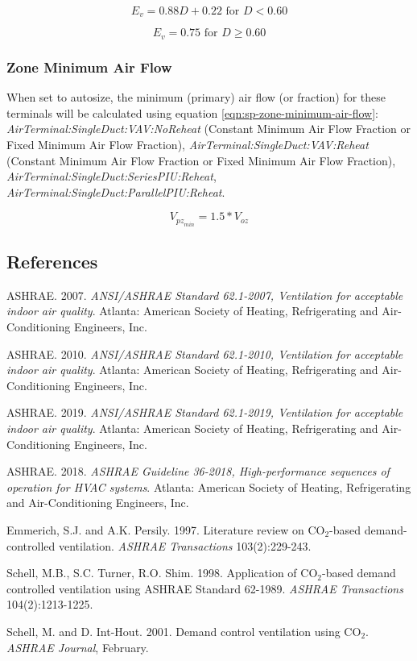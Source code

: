 \begin{equation}\label{eqn:ev-high-d}
{E_{v}} = 0.88 {D} + 0.22 \text{ for } D < 0.60
\end{equation}

\begin{equation}\label{eqn:ev-low-d}
{E_{v}} = 0.75 \text{ for } D \geq 0.60
\end{equation}

\subsubsection{Zone Minimum Air Flow}\label{sp-zone-minimum-air-flow}
When set to autosize, the minimum (primary) air flow (or fraction) for these terminals will be calculated using equation \ref{eqn:sp-zone-minimum-air-flow}: \emph{AirTerminal:SingleDuct:VAV:NoReheat} (Constant Minimum Air Flow Fraction or Fixed Minimum Air Flow Fraction), \emph{AirTerminal:SingleDuct:VAV:Reheat} (Constant Minimum Air Flow Fraction or Fixed Minimum Air Flow Fraction), \emph{AirTerminal:SingleDuct:SeriesPIU:Reheat}, \emph{AirTerminal:SingleDuct:ParallelPIU:Reheat}.

\begin{equation}\label{eqn:sp-zone-minimum-air-flow}
{V_{{pz}_{min}}} = 1.5 * {V_{oz}}
\end{equation}

\subsection{References}\label{references-018}

ASHRAE. 2007. \emph{ANSI/ASHRAE Standard 62.1-2007, Ventilation for acceptable indoor air quality}. Atlanta: American Society of Heating, Refrigerating and Air-Conditioning Engineers, Inc.

ASHRAE. 2010. \emph{ANSI/ASHRAE Standard 62.1-2010, Ventilation for acceptable indoor air quality}. Atlanta: American Society of Heating, Refrigerating and Air-Conditioning Engineers, Inc.

ASHRAE. 2019. \emph{ANSI/ASHRAE Standard 62.1-2019, Ventilation for acceptable indoor air quality}. Atlanta: American Society of Heating, Refrigerating and Air-Conditioning Engineers, Inc.

ASHRAE. 2018. \emph{ASHRAE Guideline 36-2018, High-performance sequences of operation for HVAC systems}. Atlanta: American Society of Heating, Refrigerating and Air-Conditioning Engineers, Inc.

Emmerich, S.J. and A.K. Persily. 1997. Literature review on CO\(_{2}\)-based demand-controlled ventilation. \emph{ASHRAE Transactions} 103(2):229-243.

Schell, M.B., S.C. Turner, R.O. Shim. 1998. Application of CO\(_{2}\)-based demand controlled ventilation using ASHRAE Standard 62-1989. \emph{ASHRAE Transactions} 104(2):1213-1225.

Schell, M. and D. Int-Hout. 2001. Demand control ventilation using CO\(_{2}\). \emph{ASHRAE Journal}, February.

